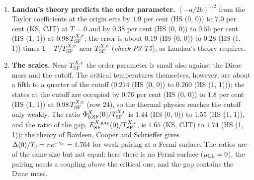\documentclass[
  10pt,
]{article}
\begin{document}
\begin{enumerate}
  \(1-T/T^{X,{\rm c}}_{\rm SF}\) (\emph{check P3-T6}). The normalized
  free energy approaches the curve \(x^4-2x^2\) (Figure 10c).
\item
  \textbf{Landau's theory predicts the order parameter.}
  \((-a/2b)^{1/2}\) from the Taylor coefficients at the origin errs by
  \(1.9\) per cent (HS (0, 0)) to \(7.0\) per cent (KS, CJT) at \(T=0\)
  and by \(0.38\) per cent (HS (0, 0)) to \(0.56\) per cent (HS (1, 1))
  at \(0.98\,T^{X,{\rm c}}_{\rm SF}\); the error is about \(0.19\) (HS
  (0, 0)) to \(0.28\) (HS (1, 1)) times \(1-T/T^{X,{\rm c}}_{\rm SF}\)
  near \(T^{X,{\rm c}}_{\rm SF}\) (\emph{check P3-T5}), as Landau's
  theory requires.
\item
  \textbf{The scales.} Near \(T^{X,{\rm c}}_{\rm SF}\) the order
  parameter is small also against the Dirac mass and the cutoff. The
  critical temperatures themselves, however, are about a fifth to a
  quarter of the cutoff (\(0.214\) (HS (0, 0)) to \(0.260\) (HS (1,
  1))); the states at the cutoff are occupied by \(0.76\) per cent (HS
  (0, 0)) to \(1.8\) per cent (HS (1, 1)) at
  \(0.98\,T^{X,{\rm c}}_{\rm SF}\) (row 24), so the thermal physics
  reaches the cutoff only weakly. The ratio
  \(\Phi^X_{0,{\rm SF}}(0)/T^{X,{\rm c}}_{\rm SF}\) is \(1.44\) (HS (0,
  0)) to \(1.55\) (HS (1, 1)), and the ratio of the gap,
  \(E^{X,{\rm gap}}_{\rm SF}(0)/T^{X,{\rm c}}_{\rm SF}\), is \(1.65\)
  (KS, CJT) to \(1.74\) (HS (1, 1)); the theory of Bardeen, Cooper and
  Schrieffer gives \(\Delta(0)/T_{\rm c}=\pi e^{-\gamma_{\rm E}}=1.764\)
  for weak pairing at a Fermi surface. The ratios are of the same size
  but not equal: here there is no Fermi surface (\(\mu_{\rm LL}=0\)),
  the pairing needs a coupling above the critical one, and the gap
  contains the Dirac mass.
\end{enumerate}
\end{document}
